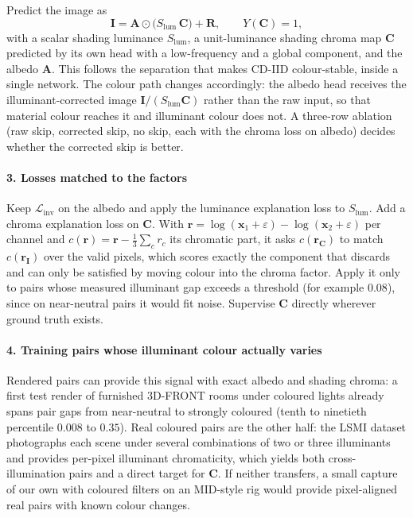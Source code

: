 Predict the image as
\begin{equation}
  \mathbf{I} = \mathbf{A} \odot \bigl(S_{\text{lum}}\,\mathbf{C}\bigr) + \mathbf{R},
  \qquad Y(\mathbf{C}) = 1 ,
  \label{eq:trifactor}
\end{equation}
with a scalar shading luminance $S_{\text{lum}}$, a unit-luminance shading chroma map
$\mathbf{C}$ predicted by its own head with a low-frequency and a global component, and
the albedo $\mathbf{A}$. This follows the separation that makes CD-IID colour-stable, inside
a single network. The colour path changes accordingly:
the albedo head receives the illuminant-corrected image
$\mathbf{I} / (S_{\text{lum}}\mathbf{C})$ rather than the raw input, so that material colour
reaches it and illuminant colour does not. A three-row ablation (raw skip, corrected skip,
no skip, each with the chroma loss on albedo) decides whether the corrected skip is better.

\paragraph{3. Losses matched to the factors}
Keep $\mathcal{L}_{\text{inv}}$ on the albedo and apply the luminance explanation loss to
$S_{\text{lum}}$. Add a chroma explanation loss on $\mathbf{C}$. With
$\mathbf{r} = \log(\mathbf{x}_1+\varepsilon) - \log(\mathbf{x}_2+\varepsilon)$ per channel and
$c(\mathbf{r}) = \mathbf{r} - \tfrac{1}{3}\sum_c r_c$ its chromatic part, it asks
$c(\mathbf{r}_{\mathbf{C}})$ to match $c(\mathbf{r}_{\mathbf{I}})$ over the valid pixels, which
scores exactly the component that  discards and can only be satisfied by moving
colour into the chroma factor. Apply it only to pairs whose measured illuminant gap exceeds
a threshold (for example $0.08$), since on near-neutral pairs it would fit noise. Supervise $\mathbf{C}$ directly wherever ground truth exists.

\paragraph{4. Training pairs whose illuminant colour actually varies}
Rendered pairs can provide this signal with exact albedo and shading chroma: a first test
render of furnished 3D-FRONT rooms under coloured lights already spans pair gaps from
near-neutral to strongly coloured (tenth to ninetieth percentile $0.008$ to $0.35$). Real coloured pairs are the other half: the LSMI dataset 
photographs each scene under several combinations of two or three illuminants and provides
per-pixel illuminant chromaticity, which yields both cross-illumination pairs and a direct
target for $\mathbf{C}$. If neither transfers, a small capture of our own with coloured
filters on an MID-style rig would provide pixel-aligned real pairs with known colour
changes.

